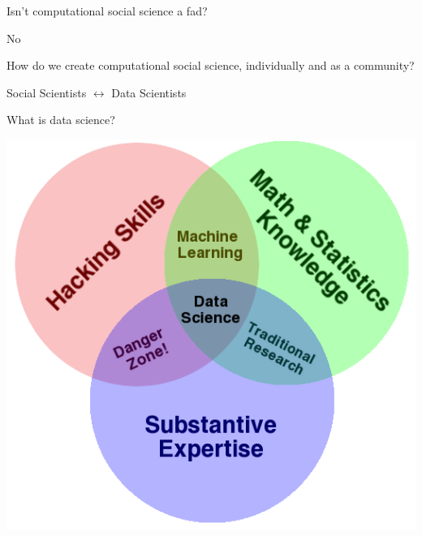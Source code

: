 \documentclass{beamer}
\def\vf{\vfill}
\begin{document}
\begin{frame}

\begin{center}
\LARGE{Isn't computational social science a fad?}
\end{center}

No

\end{frame}
\begin{frame}

\begin{center}
\LARGE{How do we create computational social science, individually and as a community?}
\end{center}

\end{frame}
\begin{frame}

\begin{center}
\LARGE{Social Scientists $\longleftrightarrow$ Data Scientists}
\end{center}

\end{frame}
\begin{frame}

\begin{center}
\LARGE{What is data science?}
\end{center}

\end{frame}
\begin{frame}

\begin{center}
\includegraphics[height=0.9\textheight]{figures/Data_Science_VD.png}
\end{center}

\vf
{}

\end{frame}
\end{document}
